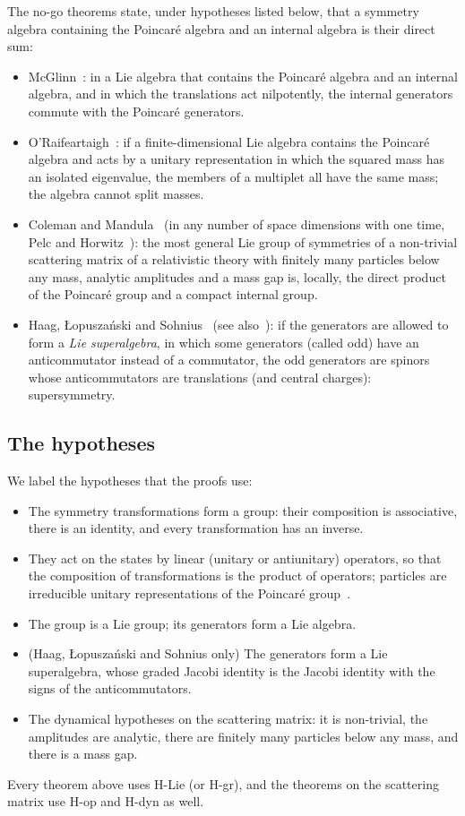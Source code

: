 The no-go theorems state, under hypotheses listed below, that a symmetry algebra containing the
Poincar\'e algebra and an internal algebra is their direct sum:
\begin{itemize}
\item McGlinn~\cite{McGlinn1964}: in a Lie algebra that contains the Poincar\'e algebra and an
internal algebra, and in which the translations act nilpotently, the internal generators commute with
the Poincar\'e generators.
\item O'Raifeartaigh~\cite{ORaifeartaigh1965}: if a finite-dimensional Lie algebra contains the
Poincar\'e algebra and acts by a unitary representation in which the squared mass has an isolated
eigenvalue, the members of a multiplet all have the same mass; the algebra cannot split masses.
\item Coleman and Mandula~\cite{ColemanMandula1967} (in any number of space dimensions with one time,
Pelc and Horwitz~\cite{PelcHorwitz1997}): the most general Lie group of symmetries of a non-trivial
scattering matrix of a relativistic theory with finitely many particles below any mass, analytic
amplitudes and a mass gap is, locally, the direct product of the Poincar\'e group and a compact
internal group.
\item Haag, {\L}opusza\'nski and Sohnius~\cite{HLS1975} (see also~\cite{WeinbergQFT3}): if the
generators are allowed to form a \emph{Lie superalgebra}, in which some generators (called odd) have
an anticommutator instead of a commutator, the odd generators are spinors whose anticommutators are
translations (and central charges): supersymmetry.
\end{itemize}

\subsection{The hypotheses}

We label the hypotheses that the proofs use:
\begin{itemize}
\item[H-grp.] The symmetry transformations form a group: their composition is associative, there is
an identity, and every transformation has an inverse.
\item[H-op.] They act on the states by linear (unitary or antiunitary) operators, so that the
composition of transformations is the product of operators; particles are irreducible unitary
representations of the Poincar\'e group~\cite{Wigner1939}.
\item[H-Lie.] The group is a Lie group; its generators form a Lie algebra.
\item[H-gr.] (Haag, {\L}opusza\'nski and Sohnius only) The generators form a Lie superalgebra, whose
graded Jacobi identity is the Jacobi identity with the signs of the anticommutators.
\item[H-dyn.] The dynamical hypotheses on the scattering matrix: it is non-trivial, the amplitudes are
analytic, there are finitely many particles below any mass, and there is a mass gap.
\end{itemize}
Every theorem above uses H-Lie (or H-gr), and the theorems on the scattering matrix use H-op and
H-dyn as well.

